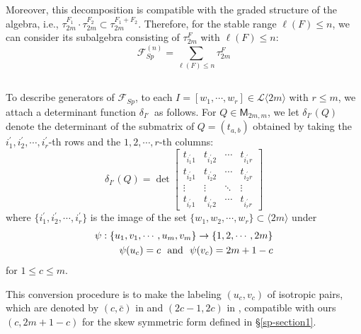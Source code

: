 \documentclass[11pt]{amsart}
\numberwithin{equation}{subsection}
\begin{document}
Moreover, this decomposition is compatible with the graded structure of the
algebra, i.e., $\tau _{2m}^{F_1}\cdot \tau _{2m}^{F_2}\subset 
\tau_{2m}^{F_1 + F_2}$. Therefore, for the stable range $\ell (F)\leq n$, 
we can consider its subalgebra consisting of $\tau _{2m}^{F}$ with 
$\ell(F)\leq n$:
\begin{equation}
\mathcal{F}_{{Sp}}^{(n)}=\sum_{\ell (F)\leq n}\tau _{2m}^{F}  \label{Sp-flag}
\end{equation}

\subsection{}

To describe generators of $\mathcal{F}_{Sp}$, to each 
$I=[w_{1},\cdots ,w_{r}]\in \mathcal{L}\langle {2m} \rangle$ with $r \leq m$, we attach a
determinant function $\delta _{I'}$\ as follows. For 
$Q \in \mathsf{M}_{2m,m}$, we let 
${\delta} _{I'}(Q)$ denote the determinant of the submatrix of $Q=(t_{a,b})$ 
obtained by taking the $i_{1}^{\prime} , i_{2}^{\prime} , \cdots , i_{r}^{\prime} $-th rows 
and the $1,2,\cdots ,r$-th columns:
\begin{equation}\label{SP_determinant}
{\delta} _{I'}(Q)=\det 
\begin{bmatrix}
t_{i_{1}^{\prime} 1} & t_{i_{1}^{\prime}  2} & \cdots & t_{i_{1}^{\prime}  r}
\\ 
t_{i_{2}^{\prime}  1} & t_{i_{2}^{\prime}  2} & \cdots & t_{i_{2}^{\prime} r}
\\ 
\vdots & \vdots & \ddots & \vdots \\ 
t_{i_{r}^{\prime}  1} & t_{i_{r}^{\prime}  2} & \cdots & t_{i_{r}^{\prime}  r}\end{bmatrix}
\end{equation}
where $\{ i_{1}^{\prime} , i_{2}^{\prime} , \cdots , i_{r}^{\prime} \}$ is the image of 
the set $\{ w_1, w_2, \cdots, w_r \} \subset \langle 2m \rangle$ under
\begin{eqnarray}\label{f-bijection}
\psi:\{u_1, v_1 ,\cdots, u_m, v_m \} \rightarrow \{1, 2, \cdots, 2m \} \\
\psi(u_c)=c \hbox{ \ and \ } \psi(v_c)=2m+1-c \notag
\end{eqnarray}
for $1 \leq c \leq m$. 

\smallskip

This conversion procedure is to make the labeling $(u_c, v_c)$ of isotropic pairs, 
which are denoted by $(c, \bar{c})$ in \cite{Be86} and $(2c-1, 2c)$ in \cite{Ki08}, 
compatible with ours $(c, 2m+1-c)$ for the skew symmetric form defined in 
\S \ref{sp-section1}.
\end{document}

